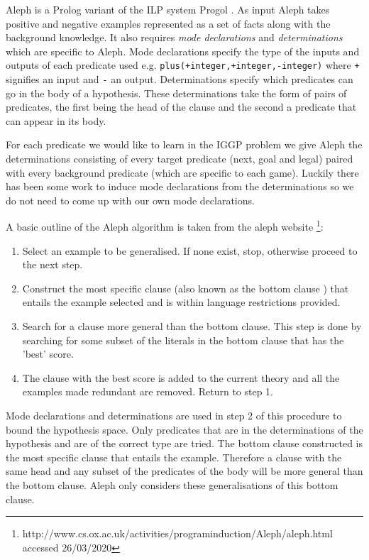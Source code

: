 Aleph is a Prolog variant of the ILP system Progol  \cite{Muggleton/Aleph}. As input Aleph takes positive and negative examples represented as a set of facts along with the background knowledge. It also requires \textit{mode declarations} and \textit{determinations} which are specific to Aleph. Mode declarations specify the type of the inputs and outputs of each predicate used e.g. \texttt{plus(+integer,+integer,-integer)} where \texttt{+} signifies an input and \texttt{-} an output.
Determinations specify which predicates can go in the body of a hypothesis. These determinations take the form of pairs of predicates, the first being the head of the clause and the second a predicate that can appear in its body.

For each predicate we would like to learn in the IGGP problem we give Aleph the determinations consisting of every target predicate (next, goal and legal) paired with every background predicate (which are specific to each game). Luckily there has been some work to induce mode declarations from the determinations  \cite{McCreath/Meta-extraction} so we do not need to come up with our own mode declarations.

A basic outline of the Aleph algorithm is taken from the aleph website \footnote{http://www.cs.ox.ac.uk/activities/programinduction/Aleph/aleph.html accessed 26/03/2020}:
\begin{enumerate}
\item Select an example to be generalised. If none exist, stop, otherwise proceed to the
next step.
\item Construct the most specific clause (also known as the bottom clause  \cite{Muggleton/Aleph}) that entails
the example selected and is within language restrictions provided.
\item Search for a clause more general than the bottom clause. This step is done by searching for some subset of the literals in the bottom clause that has the 'best' score.
\item The clause with the best score is added to the current theory and all the examples
made redundant are removed. Return to step 1.
\end{enumerate}

Mode declarations and determinations are used in step 2 of this procedure to bound the hypothesis space. Only predicates that are in the determinations of the hypothesis and are of the correct type are tried. The bottom clause constructed is the most specific clause that entails the example. Therefore a clause with the same head and any subset of the predicates of the body will be more general than the bottom clause. Aleph only considers these generalisations of this bottom clause.

